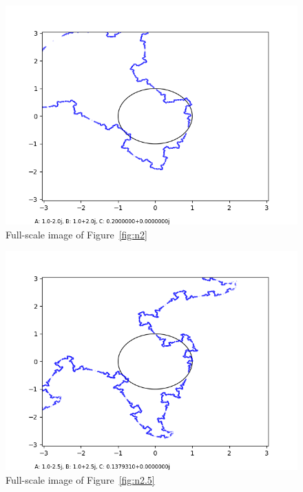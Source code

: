 \documentclass[12pt,a4paper,reqno,parskip=full]{amsart}
\numberwithin{equation}{section}
\theoremstyle{plain}
\theoremstyle{definition}
\begin{document}
\begin{figure}[H]
    \centering
    \includegraphics[width=\textwidth]{images/nn/a-2 b2 h30 d0.01.png}
    \caption{Full-scale image of Figure~\ref{fig:n2}}
\end{figure}

\begin{figure}[H]
    \centering
    \includegraphics[width=\textwidth]{images/nn/a-2.5 b2.5 h30 d0.01.png}
    \caption{Full-scale image of Figure~\ref{fig:n2.5}}
\end{figure}
\end{document}
